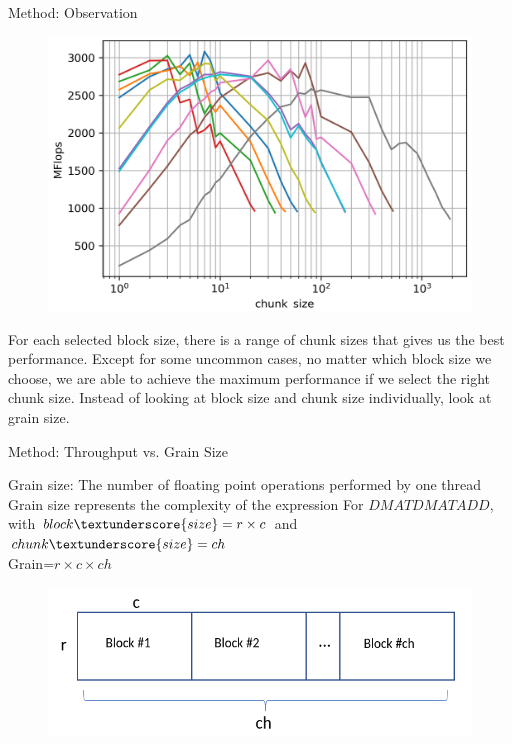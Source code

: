 \documentclass[10pt]{beamer}
\begin{document}
\begin{frame}{Method: Observation}
	\begin{outline}
		\begin{figure}
			\includegraphics[scale=0.2]{images/fig5_cropped.png}			
		\end{figure}
		\1For each selected block size, there is a range of chunk sizes that gives us the best performance. 
		\1Except for some uncommon cases, no matter which block size we choose, we are able to achieve the maximum performance if we select the right chunk size.  
		\pause
		\1Instead of looking at block size and chunk size individually, look at grain size.
	\end{outline}
\end{frame}

\begin{frame}{Method: Throughput vs. Grain Size}
	\begin{outline}
		Grain size: The number of floating point operations performed by one thread\\
		\1Grain size represents the complexity of the expression
		\1For $DMATDMATADD$, with $block\textunderscore{size}=r\times{c}$ and  $chunk\textunderscore{size}=ch$ \\ Grain=$r\times{c}\times{ch}$
		\begin{figure}[H]
			\centering\includegraphics[width=1\linewidth]{images/grain_size.png}
			
			\label{fig28}
		\end{figure}
	
	\end{outline}
\end{frame}
\end{document}
